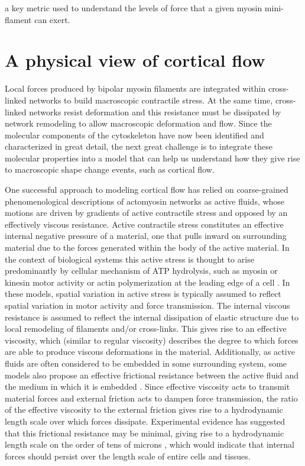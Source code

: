 a key metric used to understand the levels of force that a given myosin mini-flament can exert\cite{howard2001mechanics}.



\section{A physical view of cortical flow}

Local forces produced by bipolar myosin filaments are integrated within cross-linked networks to build macroscopic contractile stress\cite{Murrell:2015aa,Bendix20083126,Janson1005}.  At the same time, cross-linked networks resist deformation and this resistance must be dissipated by network remodeling to allow macroscopic deformation and flow.  Since the molecular components of the cytoskeleton have now been identified and characterized in great detail, the next great challenge is to integrate these molecular properties into a model that can help us understand how they give rise to macroscopic shape change events, such as cortical flow\cite{doi:10.1146/annurev-cellbio-100109-104027}.

One successful approach to modeling cortical flow has relied on coarse-grained phenomenological descriptions of actomyosin networks as active fluids, whose motions are driven by gradients of active contractile stress and opposed by an effectively viscous resistance\cite{cellmech_flows}.  Active contractile stress constitutes an effective internal negative pressure of a material, one that pulls inward on surrounding material due to the forces generated within the body of the active material\cite{whitfield2016}. In the context of biological systems this active stress is thought to arise predominantly by cellular mechanism of ATP hydrolysis, such as myosin or kinesin motor activity or actin polymerization at the leading edge of a cell \cite{activegel_Liverpool3335}. In these models, spatial variation in active stress is typically assumed to reflect spatial variation in motor activity and force transmission\cite{PhysRevLett.106.028103}.  The internal viscous resistance is assumed to reflect the internal dissipation of elastic structure due to local remodeling of filaments and/or cross-links\cite{Salbreux2012536, De-La-Cruz:2015aa}. This gives rise to an effective viscosity, which (similar to regular viscosity) describes the degree to which forces are able to produce viscous deformations in the material.  Additionally, as active fluids are often considered to be embedded in some surrounding system, some models also propose an effective frictional resistance between the active fluid and the medium in which it is embedded \cite{PhysRevLett.106.028103}.  Since effective viscosity acts to transmit material forces and external friction acts to dampen force transmission, the ratio of the effective viscosity to the external friction gives rise to a hydrodynamic length scale over which forces dissipate. Experimental evidence has suggested that this frictional resistance may be minimal, giving rise to a hydrodynamic length scale on the order of tens of microns \cite{cellmech_flows}, which would indicate that internal forces should persist over the length scale of entire cells and tissues\cite{Behrndt257}. 

